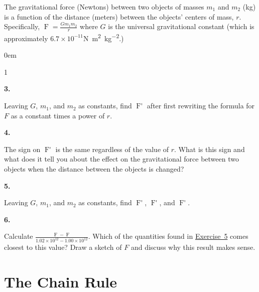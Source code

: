 \documentclass[12pt,]{book}
\theoremstyle{plain}
\theoremstyle{definition}
\numberwithin{equation}{section}
\newenvironment{exercisegroup}%
{\medskip\noindent}%
{\par\bigskip}%
\newlength{\exercisegroupindent}%
\newlength{\exercisegroupitemwidth}%
\newenvironment{exercisegrouplist}%
{\vspace{-\partopsep}%
\begin{adjustwidth}{\exercisegroupindent}{0em}}%
{\end{adjustwidth}%
\vspace{-\partopsep}%
\vspace{\baselineskip}}%
\newenvironment{exercisegroupbycol}[1]%
{\begin{exercisegrouplist}%
\vspace{-\multicolsep}%
\begin{multicols}{#1}%
\setlength{\parindent}{0em}%
\setlength{\exercisegroupitemwidth}{\linewidth}}%
{\end{multicols}%
\vspace{-\multicolsep}%
\end{exercisegrouplist}}%
\newenvironment{exercisegroupitem}[1]%
{\begin{minipage}[t]{\exercisegroupitemwidth}
\vspace{0pt}%
{\bfseries#1}%
\rule{0pt}{\baselineskip}}{\strut%
\end{minipage}%
\hspace{\columnsep}}%
\providecommand\phantomsection{}
\newcommand{\fe}[2]{\mathop{{#1}{\left(#2\right)}}}
\newcommand{\fd}[1]{#1'}
\begin{document}
\begin{exercisegroup}%
The gravitational force (Newtons) between two objects of masses \(m_1\) and \(m_2\) (\si{\kilo\gram}) is a function of the distance (meters) between the objects' centers of mass, \(r\).    Specifically, \(\fe{F}{r}=\frac{Gm_1m_2}{r}\) where \(G\) is the universal gravitational constant (which is approximately \(6.7\times10^{-11}\)\si{\newton\meter\tothe{2}\per\kilo\gram\tothe{2}}.)%
\begin{exercisegroupbycol}{1}%
\begin{exercisegroupitem}{3. }\phantomsection\hypertarget{exercise-274}{\null}
Leaving \(G\), \(m_1\), and \(m_2\) as constants, find \(\fe{\fd{F}}{r}\) after first rewriting the formula for \(F\) as a constant times a power of \(r\).%
\end{exercisegroupitem}%
\par%
\begin{exercisegroupitem}{4. }\phantomsection\hypertarget{exercise-275}{\null}
The sign on \(\fe{\fd{F}}{r}\) is the same regardless of the value of \(r\).  What is this sign and what does it tell you about the effect on the gravitational force between two objects when the distance between the objects is changed?%
\end{exercisegroupitem}%
\par%
\begin{exercisegroupitem}{5. }\phantomsection\hypertarget{exercise-evaluate-gravity}{\null}
Leaving \(G\), \(m_1\), and \(m_2\) as constants, find \(\fe{\fd{F}}{1.00\times10^{12}}\), \(\fe{\fd{F}}{1.01\times10^{12}}\), and \(\fe{\fd{F}}{1.02\times10^{12}}\).%
\end{exercisegroupitem}%
\par%
\begin{exercisegroupitem}{6. }\phantomsection\hypertarget{exercise-277}{\null}
Calculate \(\frac{\fe{F}{1.02\times10^{12}}-\fe{F}{1.00\times10^{12}}}{1.02\times10^{12}-1.00\times10^{12}}\). Which of the quantities found in \hyperref[exercise-evaluate-gravity]{Exercise~5} comes closest to this value?  Draw a sketch of \(F\) and discuss why this result makes sense.%
\end{exercisegroupitem}%
\par%
\end{exercisegroupbycol}%
\end{exercisegroup}%
\typeout{************************************************}
\typeout{************************************************}
\chapter[The Chain Rule]{The Chain Rule}\label{chapter-chain-rule}
\typeout{************************************************}
\typeout{************************************************}
\end{document}
